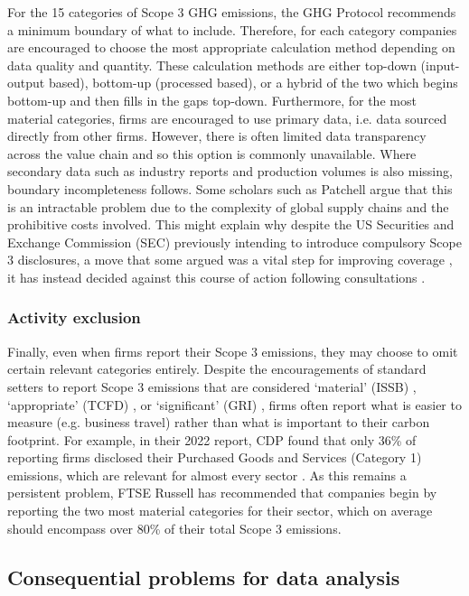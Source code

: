 \documentclass[12pt,twoside]{report}
\begin{document}
For the 15 categories of Scope 3 GHG emissions, the GHG Protocol recommends a minimum boundary of what to include. Therefore, for each category companies are encouraged to choose the most appropriate calculation method depending on data quality and quantity. These calculation methods are either top-down (input-output based), bottom-up (processed based), or a hybrid of the two which begins bottom-up and then fills in the gaps top-down. Furthermore, for the most material categories, firms are encouraged to use primary data, i.e. data sourced directly from other firms. However, there is often limited data transparency across the value chain and so this option is commonly unavailable. Where secondary data such as industry reports and production volumes is also missing, boundary incompleteness follows. Some scholars such as Patchell \cite{patchell2018} argue that this is an intractable problem due to the complexity of global supply chains and the prohibitive costs involved. This might explain why despite the US Securities and Exchange Commission (SEC) previously intending to introduce compulsory Scope 3 disclosures, a move that some argued was a vital step for improving coverage \cite{lgim2023}, it has instead decided against this course of action following consultations \cite{sec2024}.

\subsubsection{Activity exclusion}

Finally, even when firms report their Scope 3 emissions, they may choose to omit certain relevant categories entirely. Despite the encouragements of standard setters to report Scope 3 emissions that are considered `material' (ISSB) \cite{ifrs2023}, `appropriate' (TCFD) \cite{tcfd2021}, or `significant' (GRI) \cite{gri2016},  firms often report what is easier to measure (e.g. business travel) rather than what is important to their carbon footprint. For example, in their 2022 report, CDP found that only 36\% of reporting firms disclosed their Purchased Goods and Services (Category 1) emissions, which are relevant for almost every sector \cite{cdp2022}. As this remains a persistent problem, FTSE Russell \cite{ftserussell2024} has recommended that companies begin by reporting the two most material categories for their sector, which on average should encompass over 80\% of their total Scope 3 emissions. 

\subsection{Consequential problems for data analysis}
\end{document}
